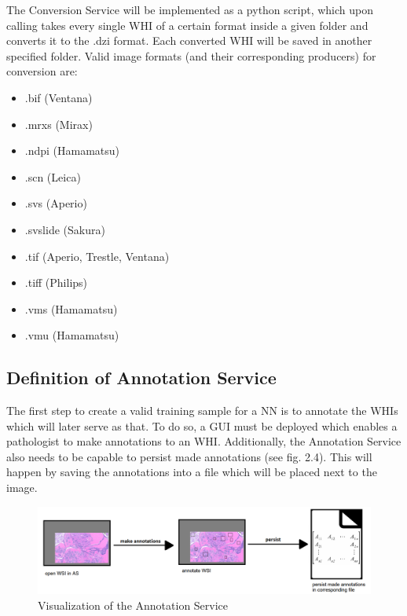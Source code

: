 The Conversion Service will be implemented as a python script, which upon calling takes every single WHI of a certain format inside a given folder and converts it to the .dzi format. Each converted WHI will be saved in another specified folder. Valid image formats (and their corresponding producers) for conversion are:

\begin{itemize}
	\item .bif (Ventana)
	\item .mrxs (Mirax)
	\item .ndpi (Hamamatsu)
	\item .scn (Leica)
	\item .svs (Aperio)
	\item .svslide (Sakura)
	\item .tif (Aperio, Trestle, Ventana)
	\item .tiff (Philips)
	\item .vms (Hamamatsu)
	\item .vmu (Hamamatsu)
\end{itemize}


\subsection{Definition of Annotation Service}

The first step to create a valid training sample for a NN is to annotate the WHIs which will later serve as that. To do so, a GUI must be deployed which enables a pathologist to make annotations to an WHI. Additionally, the Annotation Service also needs to be capable to persist made annotations (see fig. 2.4). This will happen by saving the annotations into a file which will be placed next to the image.

\begin{figure}[H]
	\begin{center}
		\includegraphics[scale=0.25]{img/processChainB.png}
		\caption{Visualization of the Annotation Service}
		\label{fig:fig2.4}
	\end{center}
\end{figure}

